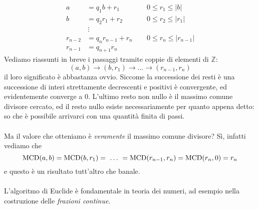 \begin{osservazione}
\begin{equation*}
\begin{array}{rllll}
		a 		& = q_1b + r_1 & \quad\ 0 \leq r_1 \leq  |b|\\
		b 		& = q_2r_1 + r_2 & \quad\ 0 \leq r_2 \leq |r_1|\\
		   		& \,\vdots 		  & \\		
		r_{n-2} & = q_{n}r_{n-1}+r_n & \quad\ 0 \leq r_n \leq |r_{n-1}|\\
		r_{n-1} & = q_{n+1}r_n		 & 
	\end{array}
\end{equation*}
Vediamo riassunti in breve i passaggi tramite coppie di elementi di $\mathbb{Z}$:
\begin{equation*}
(a,b) \to (b,r_1)\to\dots\to(r_{n-1},r_n)
\end{equation*}
il loro significato è abbastanza ovvio. Siccome la successione dei resti è una successione di interi strettamente decrescenti e positivi è convergente, ed evidentemente converge a $0$. L'ultimo resto non nullo è il massimo comune divisore cercato, ed il resto nullo esiste necessariamente per quanto appena detto: so che è possibile arrivarci con una quantità finita di passi. \\ \\ Ma il valore che otteniamo è \textit{veramente} il massimo comune divisore? Sì, infatti vediamo che
\begin{equation*}	
	\operatorname{\mathrm{MCD}}(a,b)= \operatorname{\mathrm{MCD}}(b,r_1)= \ \dots \ = \operatorname{\mathrm{MCD}}(r_{n-1},r_n)= \operatorname{\mathrm{MCD}}(r_{n},0) = r_n
\end{equation*}
e questo è un risultato tutt'altro che banale. \\ \\
L'algoritmo di Euclide è fondamentale in teoria dei numeri, ad esempio nella costruzione delle \textit{frazioni continue}.
\end{osservazione}
